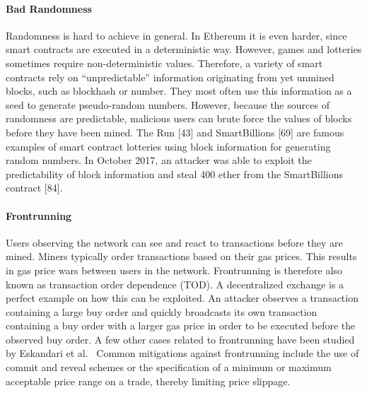         \paragraph{Bad Randomness}
            Randomness is hard to achieve in general. In Ethereum it is even harder, since smart contracts are executed in a deterministic way.
            However, games and lotteries sometimes require non-deterministic values. Therefore, a variety of smart contracts rely on “unpredictable” information originating from yet unmined blocks, such as blockhash or number. They most often use this information as a seed to generate pseudo-random numbers. However, because the sources of randomness are predictable, malicious users can brute force the values of blocks before they have been mined.
            The Run [43] and SmartBillions [69] are famous examples of smart contract lotteries using block information for generating random numbers.
            In October 2017, an attacker was able to exploit the predictability of block information and steal 400 ether from the SmartBillions contract [84].

        \paragraph{Frontrunning}
            Users observing the network can see and react to transactions before they are mined. Miners typically order transactions based on their gas prices.
            This results in gas price wars between users in the network.
            Frontrunning is therefore also known as transaction order dependence (TOD).
            A decentralized exchange is a perfect example on how this can be exploited. An attacker observes a transaction containing a large buy order and quickly broadcasts its own transaction containing a buy order with a larger gas price in order to be executed before the observed buy order.
            A few other cases related to frontrunning have been studied by Eskandari et al.~\cite{eskandari2019sok}
            Common mitigations against frontrunning include the use of commit and reveal schemes or the specification of a minimum or maximum acceptable price range on a trade, thereby limiting price slippage.
        
